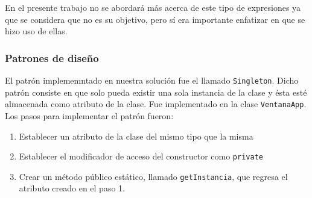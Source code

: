 En el presente trabajo no se abordará más acerca de este tipo de expresiones ya que se considera que no es su objetivo, pero sí era 
importante enfatizar en que se hizo uso de ellas.

\subsubsection*{Patrones de diseño}
El patrón implememntado en nuestra solución fue el llamado \texttt{Singleton}. Dicho patrón consiste en que solo pueda existir una sola
instancia de la clase y ésta esté almacenada como atributo de la clase. Fue implementado en la clase \texttt{VentanaApp}. Los pasos para implementar el patrón fueron:
\begin{enumerate}
    \item Establecer un atributo de la clase del mismo tipo que la misma
    \item Establecer el modificador de acceso del constructor como \texttt{private}
    \item Crear un método público estático, llamado \texttt{getInstancia}, que regresa el atributo creado en el paso 1.
\end{enumerate}